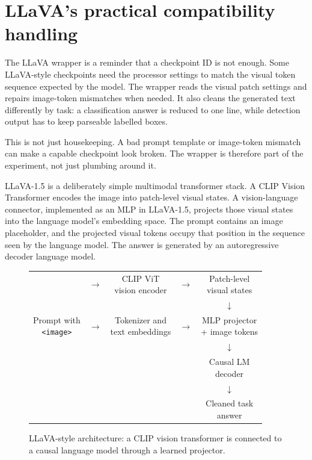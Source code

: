 \documentclass[11pt,a4paper]{report}
\newcommand{\code}[1]{\texttt{#1}}
\newcommand{\archbox}[2]{\fcolorbox{accent}{soft}{\parbox{#1}{\centering #2}}}
\begin{document}
\section{LLaVA's practical compatibility handling}
The LLaVA wrapper is a reminder that a checkpoint ID is not enough.  Some
LLaVA-style checkpoints need the processor settings to match the visual token
sequence expected by the model.  The wrapper reads the visual patch settings
and repairs image-token mismatches when needed.  It also cleans the generated
text differently by task: a classification answer is reduced to one line,
while detection output has to keep parseable labelled boxes.

This is not just housekeeping.  A bad prompt template or image-token mismatch
can make a capable checkpoint look broken.  The wrapper is therefore part of
the experiment, not just plumbing around it.

LLaVA-1.5 is a deliberately simple multimodal transformer stack.  A CLIP
Vision Transformer encodes the image into patch-level visual states.  A
vision-language connector, implemented as an MLP in LLaVA-1.5, projects those
visual states into the language model's embedding space.  The prompt contains
an image placeholder, and the projected visual tokens occupy that position in
the sequence seen by the language model.  The answer is generated by an
autoregressive decoder language model.

\begin{figure}[H]
\centering
\begin{tabular}{c c c c c}
\archbox{30mm}{Image} & $\rightarrow$ &
\archbox{35mm}{CLIP ViT\\vision encoder} & $\rightarrow$ &
\archbox{35mm}{Patch-level\\visual states} \\
&&&& $\downarrow$ \\[-1mm]
\archbox{30mm}{Prompt with\\\code{<image>}} & $\rightarrow$ &
\archbox{35mm}{Tokenizer and\\text embeddings} & $\rightarrow$ &
\archbox{35mm}{MLP projector\\+ image tokens} \\
&&&& $\downarrow$ \\[-1mm]
&&&& \archbox{35mm}{Causal LM\\decoder} \\
&&&& $\downarrow$ \\[-1mm]
&&&& \archbox{35mm}{Cleaned task\\answer}
\end{tabular}
\caption{LLaVA-style architecture: a CLIP vision transformer is connected to a
causal language model through a learned projector.}
\label{fig:llavaarch}
\end{figure}
\end{document}
